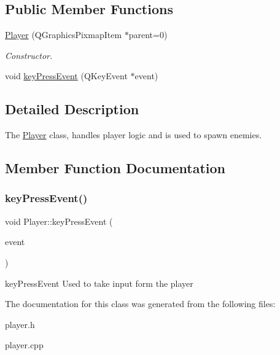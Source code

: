 \subsection*{Public Member Functions}
\begin{DoxyCompactItemize}
\item 
\mbox{\label{classPlayer_aa3689d20c55d7dfe735cf47c2d6d7dbb}} 
\hyperlink{classPlayer_aa3689d20c55d7dfe735cf47c2d6d7dbb}{Player} (Q\+Graphics\+Pixmap\+Item $\ast$parent=0)
\begin{DoxyCompactList}\small\item\em Constructor. \end{DoxyCompactList}\item 
void \hyperlink{classPlayer_a4d269c4118c29b0ee85c1e0f674260ee}{key\+Press\+Event} (Q\+Key\+Event $\ast$event)
\end{DoxyCompactItemize}


\subsection{Detailed Description}
The \hyperlink{classPlayer}{Player} class, handles player logic and is used to spawn enemies. 

\subsection{Member Function Documentation}
\mbox{\label{classPlayer_a4d269c4118c29b0ee85c1e0f674260ee}} 
\subsubsection{\texorpdfstring{key\+Press\+Event()}{keyPressEvent()}}
{\footnotesize\ttfamily void Player\+::key\+Press\+Event (\begin{DoxyParamCaption}\item[{Q\+Key\+Event $\ast$}]{event }\end{DoxyParamCaption})}

key\+Press\+Event Used to take input form the player 

The documentation for this class was generated from the following files\+:\begin{DoxyCompactItemize}
\item 
player.\+h\item 
player.\+cpp\end{DoxyCompactItemize}
